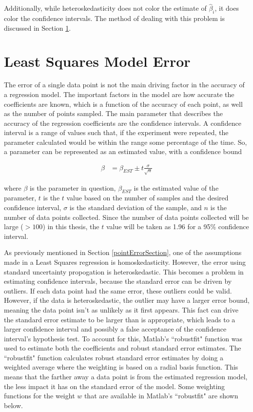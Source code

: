 Additionally, while heteroskedasticity does not color the estimate of $\hat{\beta}_i$, it does color the confidence intervals. The method of dealing with this problem is discussed in Section \ref{leastSquaresError}.


\section{Least Squares Model Error}
\label{leastSquaresError}
The error of a single data point is not the main driving factor in the accuracy of a regression model. The important factors in the model are how accurate the coefficients are known, which is a function of the accuracy of each point, as well as the number of points sampled. The main parameter that describes the accuracy of the regression coefficients are the confidence intervals. A confidence interval is a range of values such that, if the experiment were repeated, the parameter calculated would be within the range some percentage of the time. So, a parameter can be represented as an estimated value, with a confidence bound

\begin{align}
\label{confidenceInterval}
\beta &= \beta_{EST} \pm t\frac{\sigma}{\sqrt{n}}
\end{align}

where $\beta$ is the parameter in question, $\beta_{EST}$ is the estimated value of the parameter, $t$ is the $t$ value based on the number of samples and the desired confidence interval, $\sigma$ is the standard deviation of the sample, and $n$ is the number of data points collected. Since  the number of data points collected will be large ($>100$) in this thesis, the $t$ value will be taken as 1.96 for a 95\% confidence interval.

\indent

As previously mentioned in Section \ref{pointErrorSection}, one of the assumptions made in a Least Squares regression is homoskedasticity. However, the error using standard uncertainty propogation is heteroskedastic. This becomes a problem in estimating confidence intervals, because the standard error can be driven by outliers. If each data point had the same error, these outliers could be valid. However, if the data is heteroskedastic, the outlier may have a larger error bound, meaning the data point isn't as unlikely as it first appears. This fact can drive the standard error estimate to be larger than is appropriate, which leads to a larger confidence interval and possibly a false acceptance of the confidence interval's hypothesis test. To account for this, Matlab's ``robustfit" function was used to estimate both the coefficients and robust standard error estimates. The ``robustfit" function calculates robust standard error estimates by doing a weighted average where the weighting is based on a radial basis function. This means that the farther away a data point is from the estimated regression model, the less impact it has on the standard error of the model. Some weighting functions for the weight $w$ that are available in Matlab's ``robustfit" are shown below.

